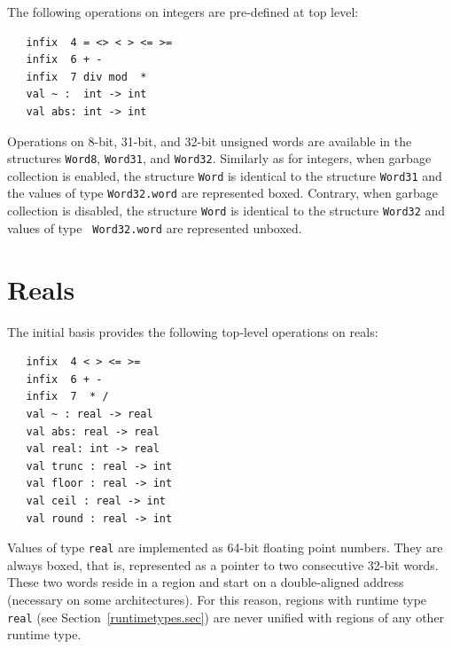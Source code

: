 \documentclass[12pt]{book}
\begin{document}
The following operations on integers are pre-defined at top level:
%
%
%
%
%
%
%
%
%
%
%
%
%
\begin{verbatim}
   infix  4 = <> < > <= >= 
   infix  6 + - 
   infix  7 div mod  * 
   val ~ :  int -> int
   val abs: int -> int
\end{verbatim}

Operations on 8-bit, 31-bit, and 32-bit unsigned words are available
in the structures 
%
{\tt Word8}, 
%
{\tt Word31}, and 
%
{\tt Word32}.
Similarly as for integers, when garbage collection is enabled, the
structure {\tt Word} is identical to the structure {\tt Word31} and
the values of type {\tt Word32.word} are represented boxed. Contrary,
when garbage collection is disabled, the structure {\tt Word} is
identical to the structure {\tt Word32} and values of type {\tt
  Word32.word} are represented unboxed.

\section{Reals}
The 
%
initial basis provides the following top-level operations on reals:
%
%
%
%
%
%
%
%
%
%
%
%
%
%
%
%
%
\begin{verbatim}
   infix  4 < > <= >= 
   infix  6 + - 
   infix  7  * /
   val ~ : real -> real
   val abs: real -> real
   val real: int -> real
   val trunc : real -> int
   val floor : real -> int
   val ceil : real -> int
   val round : real -> int
\end{verbatim}
Values of type {\tt real} are implemented as 64-bit floating point
numbers.  They are always boxed, that is, represented as a pointer to
two consecutive 32-bit 
%
words.  These two words reside in a region and start on a
double-aligned address (necessary on some architectures). For this
reason, regions with
%
runtime type {\tt real} (see
Section~\ref{runtimetypes.sec}) are never unified with regions of any
other runtime type.
\end{document}
